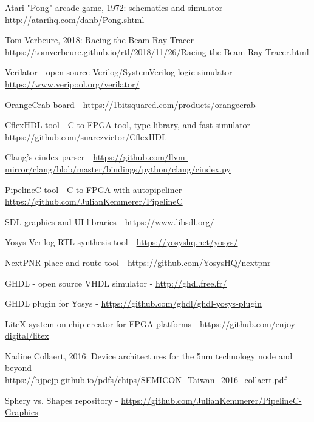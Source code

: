 \documentclass[conference]{IEEEtran}
\begin{document}
\begin{thebibliography}{00}

 Atari "Pong" arcade game, 1972: schematics and simulator -
\url{http://atarihq.com/danb/Pong.shtml} 

 Tom Verbeure, 2018: Racing the Beam Ray Tracer -
\url{https://tomverbeure.github.io/rtl/2018/11/26/Racing-the-Beam-Ray-Tracer.html} 

 Verilator - open source Verilog/SystemVerilog logic simulator - 
\url{https://www.veripool.org/verilator/}

 OrangeCrab board - \url{https://1bitsquared.com/products/orangecrab}

 CflexHDL tool - C to FPGA tool, type library, and fast simulator - 
\url{https://github.com/suarezvictor/CflexHDL}

 Clang's cindex parser - 
\url{https://github.com/llvm-mirror/clang/blob/master/bindings/python/clang/cindex.py}

 PipelineC tool - C to FPGA with autopipeliner -  \url{https://github.com/JulianKemmerer/PipelineC}

 SDL graphics and UI libraries - 
\url{https://www.libsdl.org/}

 Yosys Verilog RTL synthesis tool - 
\url{https://yosyshq.net/yosys/}

 NextPNR place and route tool - 
\url{https://github.com/YosysHQ/nextpnr}

 GHDL - open source VHDL simulator - 
\url{http://ghdl.free.fr/}

 GHDL plugin for Yosys - 
\url{https://github.com/ghdl/ghdl-yosys-plugin}

 LiteX system-on-chip creator for FPGA platforms - 
\url{https://github.com/enjoy-digital/litex}

 Nadine Collaert, 2016: Device architectures for the 5nm technology node and beyond - 
\url{https://bjpcjp.github.io/pdfs/chips/SEMICON_Taiwan_2016_collaert.pdf}

 Sphery vs. Shapes repository - \url{https://github.com/JulianKemmerer/PipelineC-Graphics}

\end{thebibliography}
\end{document}
